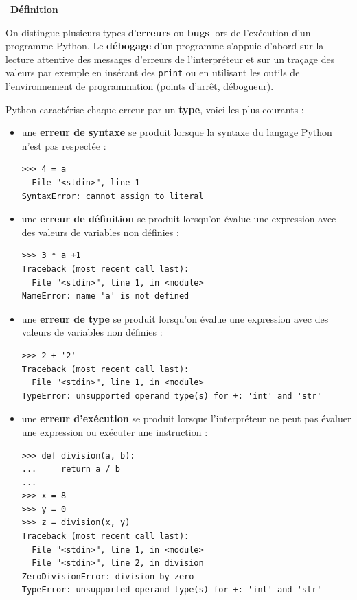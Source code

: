 \documentclass[a4paper, french, 12pt]{article}  %
\newcounter{def}
\newenvironment{definition}[1]
{\par \medskip   \addtocounter{def}{1} \noindent  
\begin{bclogo}[arrondi =0.1,  ombre = true, barre=none, logo=\bcbook, marge=4]{~\textbf{Définition} \textbf{\thedef} {\itshape #1} }  \par}
{
\end{bclogo}
 \par \bigskip }
\newcounter{prog}
\begin{document}
\begin{definition}{}

On distingue plusieurs types d'\textbf{erreurs} ou \textbf{bugs} lors de l'exécution d'un programme Python. Le \textbf{débogage} d'un programme s'appuie d'abord sur la lecture attentive des messages d'erreurs de l'interpréteur et sur un traçage des valeurs par exemple en insérant des \texttt{print} ou en utilisant les outils de l'environnement de programmation (points d'arrêt, débogueur).

Python caractérise chaque erreur par un\textbf{ type}, voici les plus courants :
\begin{itemize}

	\item une \textbf{erreur de syntaxe} se produit lorsque la syntaxe du langage Python n'est pas respectée :
	
	\begin{lstlisting}[style=compil]
>>> 4 = a
  File "<stdin>", line 1
SyntaxError: cannot assign to literal
	\end{lstlisting}
	
	\item une \textbf{erreur de définition} se produit lorsqu'on évalue une expression avec des valeurs de variables non définies :

	\begin{lstlisting}[style=compil]
>>> 3 * a +1
Traceback (most recent call last):
  File "<stdin>", line 1, in <module>
NameError: name 'a' is not defined
	\end{lstlisting}
	
	\item une   \textbf{erreur de type} se produit lorsqu'on évalue une expression avec des valeurs de variables non définies :
	
	
	
	\begin{lstlisting}[style=compil]
>>> 2 + '2'
Traceback (most recent call last):
  File "<stdin>", line 1, in <module>
TypeError: unsupported operand type(s) for +: 'int' and 'str'
	\end{lstlisting}
	
	\item une \textbf{erreur d'exécution} se produit lorsque l'interpréteur ne peut pas évaluer une expression ou exécuter une instruction :
	
		\begin{lstlisting}[style=compil]
>>> def division(a, b):
...     return a / b
... 
>>> x = 8
>>> y = 0
>>> z = division(x, y)
Traceback (most recent call last):
  File "<stdin>", line 1, in <module>
  File "<stdin>", line 2, in division
ZeroDivisionError: division by zero
TypeError: unsupported operand type(s) for +: 'int' and 'str'
	\end{lstlisting}
	

\end{itemize}
\end{definition}
\end{document}
